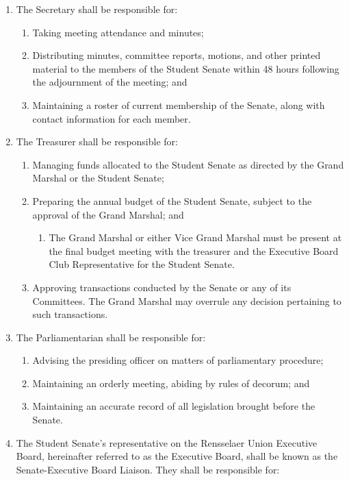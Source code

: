 \begin{enumerate}
\begin{enumerate}
  \end{enumerate}
\item The Secretary shall be responsible for:
  \begin{enumerate}
  \item Taking meeting attendance and minutes;
  \item Distributing minutes, committee reports, motions, and other printed material to the members of the Student Senate within 48 hours following the adjournment of the meeting; and
  \item Maintaining a roster of current membership of the Senate, along with contact information for each member.
  \end{enumerate}
\item The Treasurer shall be responsible for:
  \begin{enumerate}
  \item Managing funds allocated to the Student Senate as directed by the Grand Marshal or the Student Senate;
  \item Preparing the annual budget of the Student Senate, subject to the approval of the Grand Marshal; and
    \begin{enumerate}
    \item The Grand Marshal or either Vice Grand Marshal must be present at the final budget meeting with the treasurer and the Executive Board Club Representative for the Student Senate.
    \end{enumerate}
  \item Approving transactions conducted by the Senate or any of its Committees. The Grand Marshal may overrule any decision pertaining to such transactions.
  \end{enumerate}
\item The Parliamentarian shall be responsible for:
  \begin{enumerate}
  \item Advising the presiding officer on matters of parliamentary procedure;
  \item Maintaining an orderly meeting, abiding by rules of decorum; and
  \item Maintaining an accurate record of all legislation brought before the Senate.
  \end{enumerate}
\item The Student Senate’s representative on the Rensselaer Union Executive Board, hereinafter referred to as the Executive Board, shall be known as the Senate-Executive Board Liaison. They shall be responsible for:

\end{enumerate}

